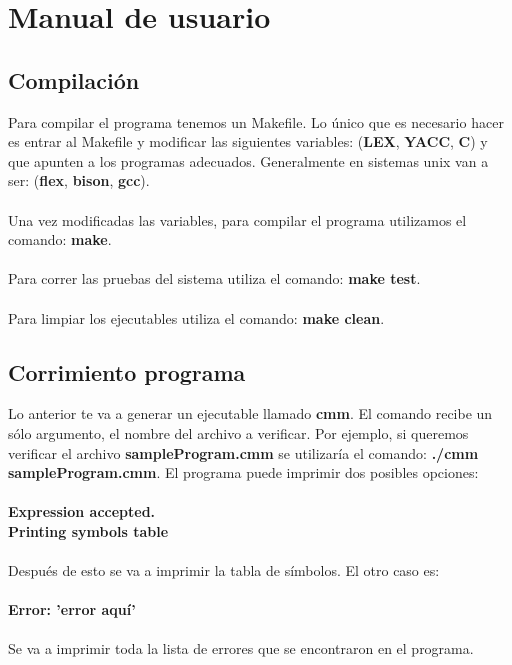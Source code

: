 \documentclass[11pt]{article}
\begin{document}
\pagebreak

\section{Manual de usuario}

\subsection{Compilación}

Para compilar el programa tenemos un Makefile. Lo único que es necesario hacer es entrar al Makefile y modificar las siguientes 
variables: (\textbf{LEX}, \textbf{YACC}, \textbf{C}) y que apunten a los programas adecuados. Generalmente en sistemas unix van 
a ser: (\textbf{flex}, \textbf{bison}, \textbf{gcc}).
\\\\
Una vez modificadas las variables, para compilar el programa utilizamos el comando: \textbf{make}.
\\\\
Para correr las pruebas del sistema utiliza el comando: \textbf{make test}.
\\\\
Para limpiar los ejecutables utiliza el comando: \textbf{make clean}.

\subsection{Corrimiento programa}

Lo anterior te va a generar un ejecutable llamado \textbf{cmm}. El comando recibe un sólo argumento, el nombre del archivo a 
verificar. Por ejemplo, si queremos verificar el archivo \textbf{sampleProgram.cmm} se utilizaría el comando: 
\textbf{./cmm sampleProgram.cmm}. El programa puede imprimir dos posibles opciones:
\\\\
\textbf{Expression accepted.}
\\
\textbf{Printing symbols table}
\\\\
Después de esto se va a imprimir la tabla de símbolos. El otro caso es:
\\\\
\textbf{Error: 'error aquí'}
\\\\
Se va a imprimir toda la lista de errores que se encontraron en el programa.
\end{document}
